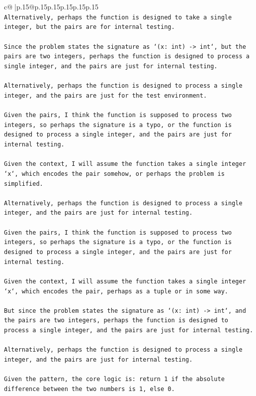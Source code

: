 \documentclass{article}
\begin{document}
{\begin{supertabular}{c@{$\;$}|p{.15\linewidth}@{}p{.15\linewidth}p{.15\linewidth}p{.15\linewidth}p{.15\linewidth}p{.15\linewidth}}
{{{\\ 
\texttt{Alternatively, perhaps the function is designed to take a single integer, but the pairs are for internal testing.} \\
\\ 
\texttt{Since the problem states the signature as `(x: int) {-}> int`, but the pairs are two integers, perhaps the function is designed to process a single integer, and the pairs are just for internal testing.} \\
\\ 
\texttt{Alternatively, perhaps the function is designed to process a single integer, and the pairs are just for the test environment.} \\
\\ 
\texttt{Given the pairs, I think the function is supposed to process two integers, so perhaps the signature is a typo, or the function is designed to process a single integer, and the pairs are just for internal testing.} \\
\\ 
\texttt{Given the context, I will assume the function takes a single integer `x`, which encodes the pair somehow, or perhaps the problem is simplified.} \\
\\ 
\texttt{Alternatively, perhaps the function is designed to process a single integer, and the pairs are just for internal testing.} \\
\\ 
\texttt{Given the pairs, I think the function is supposed to process two integers, so perhaps the signature is a typo, or the function is designed to process a single integer, and the pairs are just for internal testing.} \\
\\ 
\texttt{Given the context, I will assume the function takes a single integer `x`, which encodes the pair, perhaps as a tuple or in some way.} \\
\\ 
\texttt{But since the problem states the signature as `(x: int) {-}> int`, and the pairs are two integers, perhaps the function is designed to process a single integer, and the pairs are just for internal testing.} \\
\\ 
\texttt{Alternatively, perhaps the function is designed to process a single integer, and the pairs are just for internal testing.} \\
\\ 
\texttt{Given the pattern, the core logic is: return 1 if the absolute difference between the two numbers is 1, else 0.} \\
}}}
\end{supertabular}}
\end{document}
